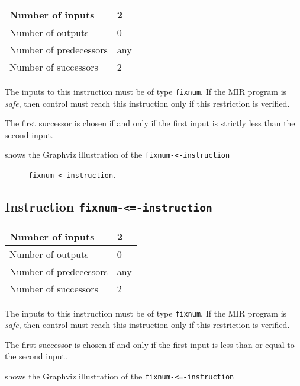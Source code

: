 \begin{tabular}{|l|l|}
\hline
Number of inputs & 2\\
\hline
Number of outputs & 0\\
\hline
Number of predecessors & any\\
\hline
Number of successors & 2\\
\hline
\end{tabular}

The inputs to this instruction must be of type \texttt{fixnum}.  If the
MIR program is \emph{safe}, then control must reach this instruction
only if this restriction is verified.

The first successor is chosen if and only if the first input is
strictly less than the second input.

 shows the Graphviz illustration of the
\texttt{fixnum-<-instruction}

\begin{figure}
\begin{center}
\end{center}
\caption{\label{fig-fixnum-less-instruction}
\texttt{fixnum-<-instruction}.}
\end{figure}

\subsection{Instruction \texttt{fixnum-<=-instruction}}
\label{mir-instruction-fixnum-le}

\begin{tabular}{|l|l|}
\hline
Number of inputs & 2\\
\hline
Number of outputs & 0\\
\hline
Number of predecessors & any\\
\hline
Number of successors & 2\\
\hline
\end{tabular}

The inputs to this instruction must be of type \texttt{fixnum}.  If the
MIR program is \emph{safe}, then control must reach this instruction
only if this restriction is verified.

The first successor is chosen if and only if the first input is
less than or equal to the second input.

 shows the Graphviz illustration of the
\texttt{fixnum-<=-instruction}

